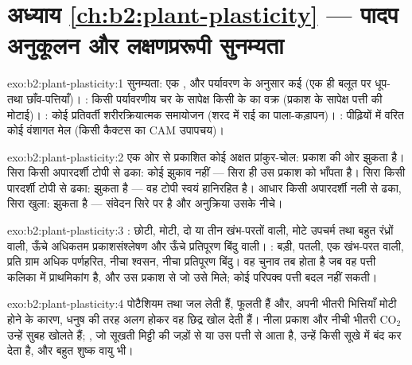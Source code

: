 \section*{अध्याय \ref{ch:b2:plant-plasticity} --- पादप अनुकूलन और लक्षणप्ररूपी सुनम्यता}

\begin{solution}{exo:b2:plant-plasticity:1}
सुनम्यता: एक , और पर्यावरण के अनुसार कई
 (एक ही बलूत पर धूप- तथा छाँव-पत्तियाँ)। :
किसी पर्यावरणीय चर के सापेक्ष किसी  के  का
वक्र (प्रकाश के सापेक्ष पत्ती की मोटाई)। : कोई प्रतिवर्ती
शरीरक्रियात्मक समायोजन (शरद में राई का पाला-कड़ापन)।
: पीढ़ियों में वरित कोई वंशागत मेल (किसी कैक्टस का CAM
उपापचय)।
\end{solution}

\begin{solution}{exo:b2:plant-plasticity:2}
एक ओर से प्रकाशित कोई अक्षत प्रांकुर-चोल: प्रकाश की ओर झुकता है। सिरा
किसी अपारदर्शी टोपी से ढका: कोई झुकाव नहीं --- सिरा ही उस
प्रकाश को भाँपता है। सिरा किसी पारदर्शी टोपी से ढका: झुकता है --- वह टोपी
स्वयं हानिरहित है। आधार किसी अपारदर्शी नली से ढका, सिरा खुला: झुकता है ---
संवेदन सिरे पर है और अनुक्रिया उसके नीचे।
\end{solution}

\begin{solution}{exo:b2:plant-plasticity:3}
: छोटी, मोटी, दो या तीन खंभ-परतों वाली, मोटे
उपचर्म तथा बहुत रंध्रों वाली, ऊँचे अधिकतम प्रकाशसंश्लेषण और ऊँचे
प्रतिपूरण बिंदु वाली। : बड़ी, पतली, एक खंभ-परत वाली,
प्रति ग्राम अधिक पर्णहरित, नीचा श्वसन, नीचा प्रतिपूरण बिंदु।
वह चुनाव तब होता है जब वह पत्ती कलिका में प्राथमिकांग है, और उस
प्रकाश से जो उसे मिले; कोई परिपक्व पत्ती बदल नहीं सकती।
\end{solution}

\begin{solution}{exo:b2:plant-plasticity:4}
 पोटैशियम तथा जल लेती हैं, फूलती हैं और, अपनी
भीतरी भित्तियाँ मोटी होने के कारण, धनुष की तरह अलग होकर वह छिद्र खोल देती
हैं। नीला प्रकाश और नीची भीतरी $\mathrm{CO_2}$ उन्हें सुबह खोलते हैं;
, जो सूखती मिट्टी की जड़ों से या उस पत्ती से आता है, उन्हें
किसी सूखे में बंद कर देता है, और बहुत शुष्क वायु भी।
\end{solution}

